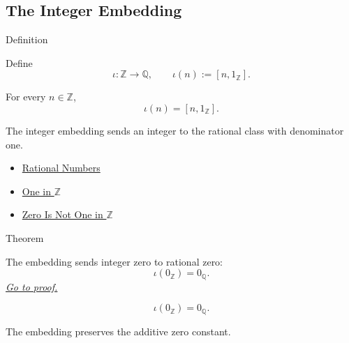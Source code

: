\subsection*{The Integer Embedding}

\begin{definitionbox}{Definition}
\begin{definition}
\label{def:rational-chapter-embedding-z-into-q}
Define
\[
\iota:\mathbb{Z}\to\mathbb{Q},
\qquad
\iota(n):=[n,1_{\mathbb{Z}}].
\]
\end{definition}
\end{definitionbox}

\begin{remark*}
For every $n\in\mathbb{Z}$,
\[
\iota(n)=[n,1_{\mathbb{Z}}].
\]
\end{remark*}

\begin{remark*}[Interpretation]
The integer embedding sends an integer to the rational class with denominator
one.
\end{remark*}

\begin{dependencies}
\begin{itemize}
  \item \hyperref[def:rationals]{Rational Numbers}
  \item \hyperref[def:one-in-z]{One in $\mathbb{Z}$}
  \item \hyperref[thm:zero-not-one-in-z]{Zero Is Not One in $\mathbb{Z}$}
\end{itemize}
\end{dependencies}

\begin{theorembox}{Theorem}
\begin{theorem}
\label{thm:embedding-z-into-q-preserves-zero}
The embedding sends integer zero to rational zero:
\[
\iota(0_{\mathbb{Z}})=0_{\mathbb{Q}}.
\]
\hyperref[prf:embedding-z-into-q-preserves-zero]{\textit{Go to proof.}}
\end{theorem}
\end{theorembox}

\begin{remark*}
\[
\iota(0_{\mathbb{Z}})=0_{\mathbb{Q}}.
\]
\end{remark*}

\begin{remark*}[Interpretation]
The embedding preserves the additive zero constant.
\end{remark*}

